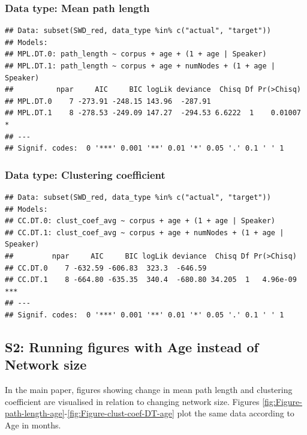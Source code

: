 \documentclass[
  man,floatsintext]{apa6}
\begin{document}
\subsubsection{Data type: Mean path length}\label{data-type-mean-path-length}

\begin{verbatim}
## Data: subset(SWD_red, data_type %in% c("actual", "target"))
## Models:
## MPL.DT.0: path_length ~ corpus + age + (1 + age | Speaker)
## MPL.DT.1: path_length ~ corpus + age + numNodes + (1 + age | Speaker)
##          npar     AIC     BIC logLik deviance  Chisq Df Pr(>Chisq)  
## MPL.DT.0    7 -273.91 -248.15 143.96  -287.91                       
## MPL.DT.1    8 -278.53 -249.09 147.27  -294.53 6.6222  1    0.01007 *
## ---
## Signif. codes:  0 '***' 0.001 '**' 0.01 '*' 0.05 '.' 0.1 ' ' 1
\end{verbatim}

\subsubsection{Data type: Clustering coefficient}\label{data-type-clustering-coefficient}

\begin{verbatim}
## Data: subset(SWD_red, data_type %in% c("actual", "target"))
## Models:
## CC.DT.0: clust_coef_avg ~ corpus + age + (1 + age | Speaker)
## CC.DT.1: clust_coef_avg ~ corpus + age + numNodes + (1 + age | Speaker)
##         npar     AIC     BIC logLik deviance  Chisq Df Pr(>Chisq)    
## CC.DT.0    7 -632.59 -606.83  323.3  -646.59                         
## CC.DT.1    8 -664.80 -635.35  340.4  -680.80 34.205  1   4.96e-09 ***
## ---
## Signif. codes:  0 '***' 0.001 '**' 0.01 '*' 0.05 '.' 0.1 ' ' 1
\end{verbatim}

\subsection{S2: Running figures with Age instead of Network size}\label{s2-running-figures-with-age-instead-of-network-size}

In the main paper, figures showing change in mean path length and clustering coefficient are visualised in relation to changing network size. Figures \ref{fig:Figure-path-length-age}-\ref{fig:Figure-clust-coef-DT-age} plot the same data according to Age in months.
\end{document}
